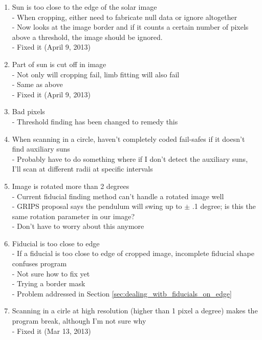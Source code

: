 \documentclass[10pt]{article}
\begin{document}
    \begin{enumerate}
        \item Sun is too close to the edge of the solar image\\
            - When cropping, either need to fabricate null data or ignore altogether\\
            - Now looks at the image border and if it counts a certain number of pixels above a threshold, the image should be ignored.\\
            - Fixed it (April 9, 2013)
        \item Part of sun is cut off in image\\
            - Not only will cropping fail, limb fitting will also fail\\
            - Same as above\\
            - Fixed it (April 9, 2013)
        \item Bad pixels\\
            - Threshold finding has been changed to remedy this
        \item When scanning in a circle, haven't completely coded fail-safes if it doesn't find auxiliary suns\\
            - Probably have to do something where if I don't detect the auxiliary suns, I'll scan at different radii at specific intervals
        \item Image is rotated more than 2 degrees\\
            - Current fiducial finding method can't handle a rotated image well\\
            - GRIPS proposal says the pendulum will swing up to $\pm$ .1 degree; is this the same rotation parameter in our image?\\
            - Don't have to worry about this anymore
        \item Fiducial is too close to edge\\
            - If a fiducial is too close to edge of cropped image, incomplete fiducial shape confuses program\\
            - Not sure how to fix yet\\
            - Trying a border mask\\
            - Problem addressed in Section \ref{sec:dealing_witb_fiducials_on_edge}
        \item Scanning in a cirle at high resolution (higher than 1 pixel a degree) makes the program   break, although I'm not sure why\\
            - Fixed it (Mar 13, 2013)
    \end{enumerate}

\end{document}
